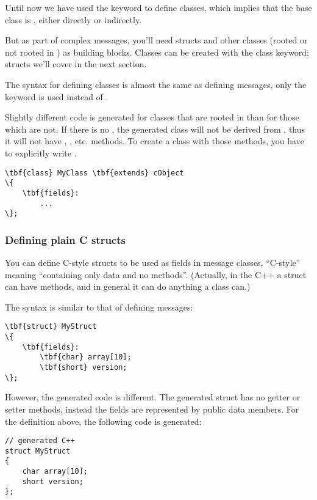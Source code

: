 Until now we have used the  keyword to define classes, which
implies that the base class is , either directly or indirectly.

But as part of complex messages, you'll need structs and other classes
(rooted or not rooted in ) as building blocks.
Classes can be created with the  class keyword;
structs we'll cover in the next section.

The syntax for defining classes is almost the same as defining messages,
only the  keyword is used instead of .

Slightly different code is generated for classes that are rooted in
 than for those which are not.
If there is no , the generated class will not be
derived from , thus it will not have ,
, etc. methods.
To create a class with those methods, you have to explicitly write
.

\begin{Verbatim}[commandchars=\\\{\}]
\tbf{class} MyClass \tbf{extends} cObject
\{
    \tbf{fields}:
        ...
\};
\end{Verbatim}



\subsubsection{Defining plain C structs}

You can define C-style structs to be used as fields in message classes,
``C-style'' meaning ``containing only data and no methods''.
(Actually, in the C++ a struct can have methods,
and in general it can do anything a class can.)

The syntax is similar to that of defining messages:

\begin{Verbatim}[commandchars=\\\{\}]
\tbf{struct} MyStruct
\{
    \tbf{fields}:
        \tbf{char} array[10];
        \tbf{short} version;
\};
\end{Verbatim}

However, the generated code is different. The generated struct has
no getter or setter methods, instead the fields are represented
by public data members. For the definition above, the
following code is generated:

\begin{verbatim}
// generated C++
struct MyStruct
{
    char array[10];
    short version;
};
\end{verbatim}

